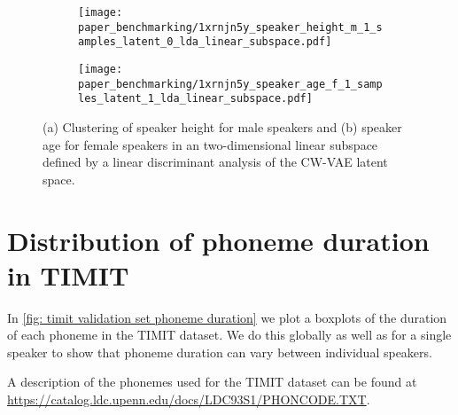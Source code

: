 {\begin{figure}[t!]
     \centering
     \hfill
     \begin{subfigure}[b]{0.48\textwidth}
         \centering
         \texttt{[image: paper\_benchmarking/1xrnjn5y\_speaker\_height\_m\_1\_samples\_latent\_0\_lda\_linear\_subspace.pdf]}
         \caption{}
         \label{fig: cwvae latent z1 height}
     \end{subfigure}
     \hfill
     \begin{subfigure}[b]{0.48\textwidth}
         \centering
         \texttt{[image: paper\_benchmarking/1xrnjn5y\_speaker\_age\_f\_1\_samples\_latent\_1\_lda\_linear\_subspace.pdf]}
         \caption{}
         \label{fig: cwvae latent z0 age}
     \end{subfigure}
    \caption[Clustering of speaker gender in 2D linear subspace of a CW-VAE latent space]{(a) Clustering of speaker height for male speakers and (b) speaker age for female speakers in an two-dimensional linear subspace defined by a linear discriminant analysis of the CW-VAE latent space.}
    \label{fig: cwvae latent height}
\end{figure}




\section{Distribution of phoneme duration in TIMIT}\label{app: timit phoneme distributions}
In \cref{fig: timit validation set phoneme duration} we plot a boxplots of the duration of each phoneme in the TIMIT dataset. We do this globally as well as for a single speaker to show that phoneme duration can vary between individual speakers. 

A description of the phonemes used for the TIMIT dataset can be found at \url{https://catalog.ldc.upenn.edu/docs/LDC93S1/PHONCODE.TXT}.

}
